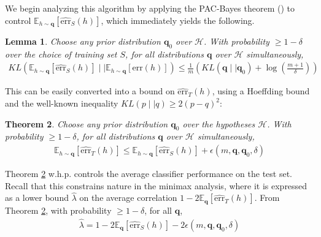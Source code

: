 \documentclass{article}[12pt]
\newtheorem{thm}{Theorem}%
\newtheorem{lem}[thm]{Lemma}
\theoremstyle{named}
\newcommand{\vq}{\mathbf{q}}
\newcommand{\evp}[2]{\mathbb{E}_{#2} \left[#1\right]} %
\newcommand{\abs}[1]{\left| #1 \right|}
\newcommand{\err}[1]{\mbox{err}\left(#1\right)}
\newcommand{\emperr}[2]{\widehat{\mbox{err}}_{#2} \left(#1\right)}
\newcommand{\cH}{\mathcal{H}}
\newcommand{\lrp}[1]{\left(#1\right)}
\begin{document}
We begin analyzing this algorithm by applying the PAC-Bayes theorem (\cite{L05}) 
to control $\evp{\emperr{h}{S}}{h \sim \vq}$, which immediately yields the following.

\begin{lem}
\label{lem:1phasepbonS}
Choose any prior distribution $\vq_0$ over $\cH$. 
With probability $\geq 1 - \delta$ over the choice of training set $S$, for all distributions $\vq$ over $\cH$ simultaneously,
\begin{align}
KL \lrp{ \evp{\emperr{h}{S}}{h \sim \vq} \mid \mid \evp{\err{h}}{h \sim \vq} } \leq \frac{1}{m} \lrp{ KL (\vq \mid \mid \vq_0) + \log\lrp{\frac{m+1}{\delta}} } \nonumber
\end{align}
\end{lem}

This can be easily converted into a bound on $\emperr{h}{T}$, 
using a Hoeffding bound and the well-known inequality $KL\lrp{ p \mid \mid q } \geq 2 (p-q)^2$:
\begin{thm}
\label{thm:1phaseStoT}
Choose any prior distribution $\vq_0$ over the hypotheses $\cH$. 
With probability $\geq 1 - \delta$, for all distributions $\vq$ over $\cH$ simultaneously,
\begin{align}
\evp{\emperr{h}{T}}{h \sim \vq} \leq \evp{\emperr{h}{S}}{h \sim \vq} + \epsilon (m, \vq, \vq_0, \delta) \nonumber
\end{align}
\end{thm}

Theorem \ref{thm:1phaseStoT} w.h.p. controls the average classifier performance on the test set. 
Recall that this constrains nature in the minimax analysis, where it is expressed as a lower bound $\hat{\lambda}$ 
on the average correlation $1 - 2 \evp{\emperr{h}{T}}{\vq}$.
From Theorem \ref{thm:1phaseStoT}, with probability $\geq 1 - \delta$, for all $\vq$,
\begin{align}
\label{1phaselambda}
\hat{\lambda} = 1 - 2 \evp{\emperr{h}{S}}{\vq} - 2 \epsilon (m, \vq, \vq_0, \delta)
\end{align}
\end{document}
